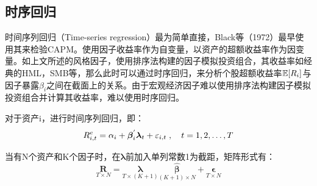 \documentclass[11pt]{article}
\begin{document}
\subsection{时序回归}

时间序列回归（Time-series regression）最为简单直接，Black等（1972）最早使用其来检验CAPM。使用因子收益率作为自变量，以资产的超额收益率作为因变量。如上文所述的风格因子，使用排序法构建的因子模拟投资组合，其收益率如经典的HML，SMB等，那么此时可以通过时序回归，来分析个股超额收益率$\mathbb{E}[R_i]$与因子暴露$\beta_i$之间在截面上的关系。由于宏观经济因子难以使用排序法构建因子模拟投资组合并计算其收益率，难以使用时序回归。

对于资产i，进行时间序列回归，即：
\begin{equation*}
    R_{i,t}^{e} = \alpha_i + \bm{\beta}_{i}^{'} \bm{\lambda}_t + \varepsilon_{i,t} \;,\quad t=1,2,\dots,T
\end{equation*}

当有N个资产和K个因子时，在$\bm{\lambda}$前加入单列常数1为截距，矩阵形式有：
\begin{equation*}
    \underset{T \times N}{\bm{R}} = \underset{ T \times (K+1)}{\bm{\lambda}} \underset{(K+1) \times N}{\hat{\bm{\beta}}} + \underset{T \times N}{\bm{\epsilon}}
\end{equation*}
\end{document}

